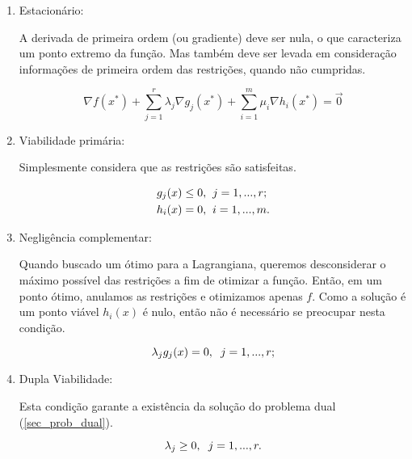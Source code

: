 \begin{enumerate}

\item Estacionário:

  A derivada de primeira ordem (ou gradiente) deve ser nula, o que caracteriza
  um ponto extremo da função. Mas também deve ser levada em consideração
  informações de primeira ordem das restrições, quando não cumpridas.

  \begin{equation}
    \nabla f(x^*) + \sum_{j=1}^r \lambda_j \nabla g_j(x^*) + \sum_{i=1}^m \mu_i \nabla h_i(x^*) = \overrightarrow{0}
  \end{equation}


\item Viabilidade primária:

  Simplesmente considera que as restrições são satisfeitas.

  \begin{equation}
    \begin{split}
      g_j(x) \leq 0, & \hspace{0.2cm} j = 1, ..., r;\\
      h_i(x) = 0,    & \hspace{0.2cm} i = 1, ..., m.
    \end{split}
  \end{equation}
  
  
  
  
\item Negligência complementar:

  Quando buscado um ótimo para a Lagrangiana, queremos desconsiderar o máximo possível
  das restrições a fim de otimizar a função. Então, em um ponto ótimo, anulamos as
  restrições e otimizamos apenas \(f\). Como a solução é um ponto viável \(h_i(x)\)
  é nulo, então não é necessário se preocupar nesta condição.

  \begin{equation}
    \lambda_j g_j(x) = 0, \hspace{0.2cm} j = 1, ..., r;
  \end{equation}
  
\item Dupla Viabilidade:

  Esta condição garante a existência da solução do problema dual (\ref{sec_prob_dual}).

  \begin{equation}
    \lambda_j \geq 0, \hspace{0.2cm} j = 1, ..., r.
  \end{equation}
  
\end{enumerate}

